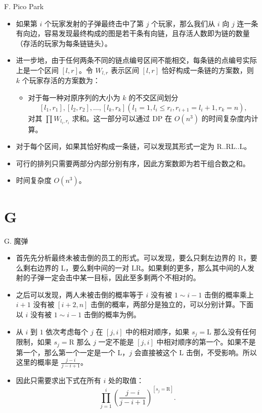 \documentclass[9pt]{ctexbeamer}
\newcommand{\setParDis}{\setlength{\parskip}{6pt}}
\begin{document}
\begin{frame}
\setParDis

F. Pico Park

\begin{itemize}
	\item 如果第 $i$ 个玩家发射的子弹最终击中了第 $j$ 个玩家，那么我们从 $i$ 向 $j$ 连一条有向边，容易发现最终构成的图是若干条有向链，且存活人数即为链的数量（存活的玩家为每条链链头）。
	\item 进一步地，由于任何两条不同的链点编号区间不能相交，每条链的点编号实际上是一个区间 $[l, r]$。令 $W_{l, r}$ 表示区间 $[l, r]$ 恰好构成一条链的方案数，则 $k$ 个玩家存活的方案数为：
		\begin{itemize}
			\item 对于每一种对原序列的大小为 $k$ 的不交区间划分 \[[l_1, r_1], [l_2, r_2], \dots, [l_k, r_k] (l_1 = 1, l_i \le r_i, r_{i + 1} = l_i + 1, r_k = n),\] 对其 $\prod W_{l_i,r_i}$ 求和。这一部分可以通过 DP 在 $O(n ^ 3)$ 的时间复杂度内计算。
		\end{itemize}
	\item 对于每个区间，如果其恰好构成一条链，可以发现其形式一定为 $\text{R..RL..L}$。
	\item 可行的排列只需要两部分内部分别有序，因此方案数即为若干组合数之和。
	\item 时间复杂度 $O(n ^ 3)$。
\end{itemize}

\end{frame}


\section{G}

\begin{frame}
\setParDis

G. 魔弹

\begin{itemize}
	\item 首先先分析最终未被击倒的员工的形式。可以发现，要么只剩左边界的 $\text{R}$，要么剩右边界的 $\text{L}$，要么剩中间的一对 $\text{LR}$。如果剩的更多，那么其中间的人发射的子弹一定会击中某一目标，因此至多剩两个不相对的。
	\item 之后可以发现，两人未被击倒的概率等于 $i$ 没有被 $1\sim i-1$ 击倒的概率乘上 $i+1$ 没有被 $[i+2,n]$ 击倒的概率，两部分是独立的，可以分别计算。下面以 $i$ 没有被 $1\sim i-1$ 击倒的概率为例。
	\item 从 $i$ 到 $1$ 依次考虑每个 $j$ 在 $[j,i]$ 中的相对顺序，如果 $s_j = \text{L}$ 那么没有任何限制，如果 $s_j = \text{R}$ 那么 $j$ 一定不能是 $[j,i]$ 中相对顺序的第一个。如果不是第一个，那么第一个一定是一个 $\text{L}$，$j$ 会直接被这个 $\text{L}$ 击倒，不受影响。所以这里的概率是 $\frac{j-i}{j-i+1}$。
	\item 因此只需要求出下式在所有 $i$ 处的取值：\[\prod\limits_{j=1}^i {\left(\frac{j-i}{j-i+1}\right)}^{[s_j = \text{R}]}.\]
\end{itemize}

\end{frame}
\end{document}
